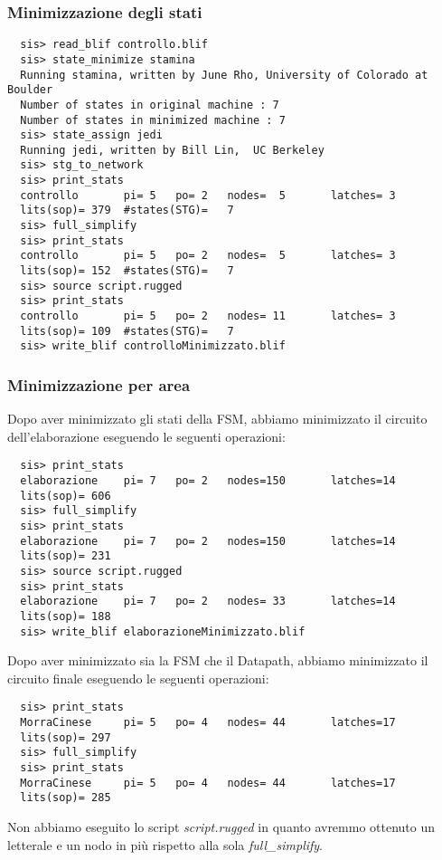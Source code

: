 \documentclass[a4paper]{article}
\begin{document}
\subsubsection{Minimizzazione degli stati}
\begin{lstlisting}
  sis> read_blif controllo.blif
  sis> state_minimize stamina
  Running stamina, written by June Rho, University of Colorado at Boulder
  Number of states in original machine : 7
  Number of states in minimized machine : 7
  sis> state_assign jedi
  Running jedi, written by Bill Lin,  UC Berkeley
  sis> stg_to_network
  sis> print_stats
  controllo       pi= 5   po= 2   nodes=  5       latches= 3
  lits(sop)= 379  #states(STG)=   7
  sis> full_simplify
  sis> print_stats
  controllo       pi= 5   po= 2   nodes=  5       latches= 3
  lits(sop)= 152  #states(STG)=   7
  sis> source script.rugged
  sis> print_stats
  controllo       pi= 5   po= 2   nodes= 11       latches= 3
  lits(sop)= 109  #states(STG)=   7
  sis> write_blif controlloMinimizzato.blif
\end{lstlisting}

\subsubsection{Minimizzazione per area}
Dopo aver minimizzato gli stati della FSM, abbiamo minimizzato il circuito dell'elaborazione eseguendo le
seguenti operazioni:
\begin{lstlisting}
  sis> print_stats
  elaborazione    pi= 7   po= 2   nodes=150       latches=14
  lits(sop)= 606
  sis> full_simplify
  sis> print_stats
  elaborazione    pi= 7   po= 2   nodes=150       latches=14
  lits(sop)= 231
  sis> source script.rugged
  sis> print_stats
  elaborazione    pi= 7   po= 2   nodes= 33       latches=14
  lits(sop)= 188
  sis> write_blif elaborazioneMinimizzato.blif
\end{lstlisting}

\noindent Dopo aver minimizzato sia la FSM che il Datapath, abbiamo minimizzato il circuito finale eseguendo le
seguenti operazioni:
\begin{lstlisting}
  sis> print_stats
  MorraCinese     pi= 5   po= 4   nodes= 44       latches=17
  lits(sop)= 297
  sis> full_simplify
  sis> print_stats
  MorraCinese     pi= 5   po= 4   nodes= 44       latches=17
  lits(sop)= 285
\end{lstlisting}
\noindent Non abbiamo eseguito lo script \emph{script.rugged} in quanto avremmo ottenuto un letterale e un nodo
in più rispetto alla sola \emph{full\_simplify}.
\end{document}
